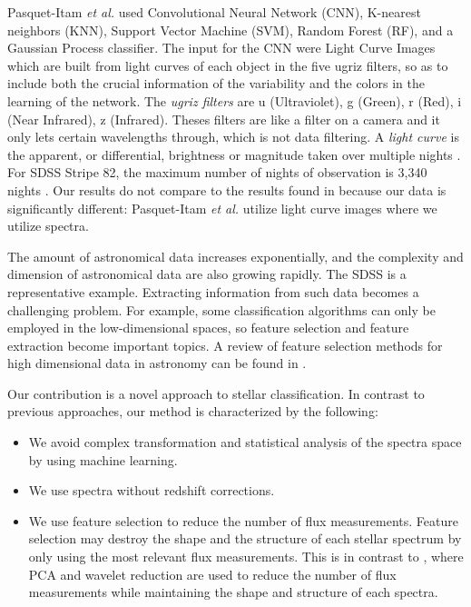 \documentclass[conference]{IEEEtran}
\begin{document}
Pasquet-Itam \textit{et al.} used Convolutional Neural Network (CNN), K-nearest neighbors (KNN), Support Vector Machine (SVM), Random Forest (RF), and a Gaussian Process classifier. The input for the CNN were Light Curve Images which are built from light curves of each object in the five ugriz filters, so as to include both the crucial information of the variability and the colors in the learning of the network. The \textit{ugriz filters} are u (Ultraviolet), g (Green), r (Red), i (Near Infrared), z (Infrared). Theses filters are like a filter on a camera and it only lets certain wavelengths through, which is not data filtering. A \textit{light curve} is the apparent, or differential, brightness or magnitude taken over multiple nights \cite{Chromey}. For SDSS Stripe 82, the maximum number of nights of observation is 3,340 nights \cite{Pasquet2018}. Our results do not compare to the results found in \cite{Pasquet2018} because our data is significantly different:  Pasquet-Itam \textit{et al.} utilize light curve images where we utilize spectra. 

The amount of astronomical data increases exponentially, and the complexity and dimension of astronomical data are also
growing rapidly. The SDSS is a representative example. Extracting information from such data becomes a challenging problem.
For example, some classification algorithms can only be employed in the low-dimensional spaces, so feature selection and
feature extraction become important topics. A review of feature selection methods for high dimensional data in astronomy can
be found in \cite{Zheng}.

Our contribution is a novel approach to stellar classification. In contrast to previous approaches, our method is characterized by the following:

\begin{itemize}
	\item We avoid complex transformation and statistical analysis of the spectra space by using machine learning.
	\item We use spectra without redshift corrections.
	\item We use feature selection to reduce the number of flux measurements. Feature selection may destroy the shape and the structure of each stellar spectrum by only using the most relevant flux measurements. This is in contrast to \cite{Xing}, where PCA and wavelet reduction are used to reduce the number of flux measurements while maintaining the shape and structure of each spectra. 
\end{itemize}
\end{document}
